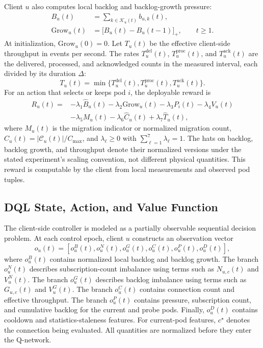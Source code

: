 \documentclass[manuscript,nonacm]{acmart}
\begin{document}
Client $u$ also computes local backlog and backlog-growth pressure:
\begin{align}
	B_u(t) &= \sum_{k\in\mathcal{K}_u(t)} b_{u,k}(t),\\
	\mathrm{Grow}_u(t) &= \bigl[B_u(t)-B_u(t-1)\bigr]_+,\qquad t\geq1.
\end{align}
At initialization, $\mathrm{Grow}_u(0)=0$. Let $T_u(t)$ be the effective client-side
throughput in events per second. The rates $T^{\mathrm{del}}_u(t)$, $T^{\mathrm{proc}}_u(t)$,
and $T^{\mathrm{ack}}_u(t)$ are the delivered, processed, and acknowledged counts in
the measured interval, each divided by its duration $\Delta$:
\begin{equation}
	T_u(t)=
	\min\{T^{\mathrm{del}}_u(t),T^{\mathrm{proc}}_u(t),T^{\mathrm{ack}}_u(t)\}.
\end{equation}
For an action that selects or keeps pod $i$, the deployable reward is
\begin{align}
	R_u(t)=
	&-\lambda_1\widehat{B}_u(t)
	-\lambda_2\widehat{\mathrm{Grow}}_u(t)
	-\lambda_3 P_i(t)
	-\lambda_4 V_u(t) \nonumber\\
	&-\lambda_5 M_u(t)
	-\lambda_6\widehat{C}_u(t)
	+\lambda_7\widehat{T}_u(t),
	\label{eq:deployable_reward}
\end{align}
where $M_u(t)$ is the migration indicator or normalized migration count,
$\widehat{C}_u(t)=|\mathcal{C}_u(t)|/C_{\max}$, and
$\lambda_\ell\geq0$ with $\sum_{\ell=1}^{7}\lambda_\ell=1$.
The hats on backlog, backlog growth, and throughput denote their normalized
versions under the stated experiment's scaling convention, not different
physical quantities. This reward is computable by the client from
local measurements and observed pod tuples.

\subsection{DQL State, Action, and Value Function}

The client-side controller is modeled as a partially observable sequential
decision problem. At each control epoch, client $u$ constructs an observation
vector
\begin{equation}
	o_u(t)=
	\left[
	o^B_u(t),o^N_u(t),o^G_u(t),o^C_u(t),o^P_u(t),o^D_u(t)
	\right],
	\label{eq:dql_observation}
\end{equation}
where $o^B_u(t)$ contains normalized local backlog and backlog growth.
The branch $o^N_u(t)$ describes subscription-count imbalance using terms such as
$N_{u,c}(t)$ and $V^N_u(t)$. The branch $o^G_u(t)$ describes backlog imbalance
using terms such as $G_{u,c}(t)$ and $V^G_u(t)$.
The branch $o^C_u(t)$ contains connection count and effective throughput.
The branch $o^P_u(t)$ contains pressure, subscription count, and cumulative
backlog for the current and probe pods. Finally, $o^D_u(t)$ contains cooldown
and statistics-staleness features. For current-pod features, $c^\star$ denotes
the connection being evaluated. All quantities are normalized before they
enter the Q-network.
\end{document}
